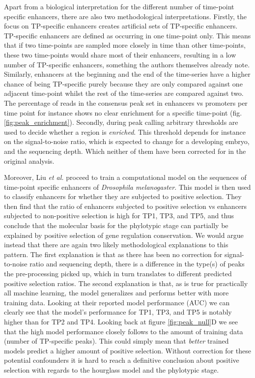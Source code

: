 Apart from a biological interpretation for the different number of time-point specific enhancers, there are also two methodological interpretations. Firstly, the focus on TP-specific enhancers creates artificial sets of TP-specific enhancers. TP-specific enhancers are defined as occurring in one time-point only. This means that if two time-points are sampled more closely in time than other time-points, these two time-points would share most of their enhancers, resulting in a low number of TP-specific enhancers, something the authors themselves already note. Similarly, enhancers at the beginning and the end of the time-series have a higher chance of being TP-specific purely because they are only compared against one adjacent time-point whilst the rest of the time-series are compared against two. The percentage of reads in the consensus peak set in enhancers vs promoters per time point for instance shows no clear enrichment for a specific time-point (fig. \ref{fig:peak_enrichment}). Secondly, during peak calling arbitrary thresholds are used to decide whether a region is \textit{enriched}. This threshold depends for instance on the signal-to-noise ratio, which is expected to change for a developing embryo, and the sequencing depth\cite{encode_guidelines2012}. Which neither of them have been corrected for in the original analysis.

Moreover, Liu \textit{et al.} proceed to train a computational model on the sequences of time-point specific enhancers of \textit{Drosophila melanogaster}. This model is then used to classify enhancers for whether they are subjected to positive selection. They then find that the ratio of enhancers subjected to positive selection vs enhancers subjected to non-positive selection is high for TP1, TP3, and TP5, and thus conclude that the molecular basis for the phylotypic stage can partially be explained by positive selection of gene regulation conservation. We would argue instead that there are again two likely methodological explanations to this pattern. The first explanation is that as there has been no correction for signal-to-noise ratio and sequencing depth, there is a difference in the type(s) of peaks the pre-processing picked up, which in turn translates to different predicted positive selection ratios. The second explanation is that, as is true for practically all machine learning, the model generalizes and performs better with more training data. Looking at their reported model performance (AUC) we can clearly see that the model's performance for TP1, TP3, and TP5 is notably higher than for TP2 and TP4. Looking back at figure \ref{fig:peak_null}D we see that the high model performance closely follows to the amount of training data (number of TP-specific peaks). This could simply mean that \textit{better} trained models predict a higher amount of positive selection. Without correction for these potential confounders it is hard to reach a definitive conclusion about positive selection with regards to the hourglass model and the phylotypic stage.


